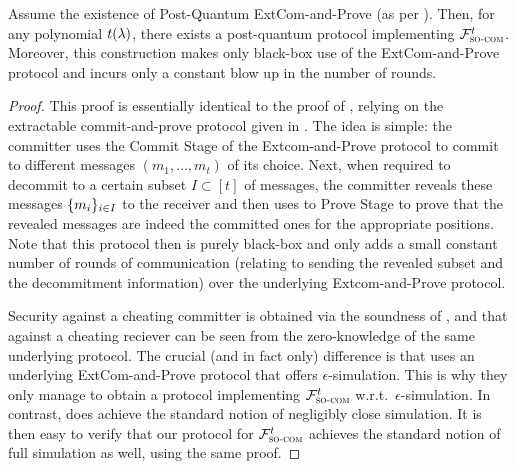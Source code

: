 \begin{lemma}
\label{lem:ExtCin-and-Prove:to:SO-Com}
Assume the existence of Post-Quantum ExtCom-and-Prove (as per ). Then, for any polynomial $t(\lambda)$, there exists a post-quantum protocol implementing $\mathcal{F}^t_\textsc{so-com}$. Moreover, this construction makes only black-box use of the ExtCom-and-Prove protocol and incurs only a constant blow up in the number of rounds.
\end{lemma}
\begin{proof}
This proof is essentially identical to the proof of \cite[Lemma 26]{C:CCLY22}, relying on the extractable commit-and-prove protocol given in . The idea is simple: the committer uses the Commit Stage of the Extcom-and-Prove protocol to commit to different messages $(m_1,\dots,m_t)$ of its choice. Next, when required to decommit to a certain subset $I \subset [t]$ of messages, the committer reveals these messages $\{m_i\}_{i \in I}$ to the receiver and then uses to Prove Stage to prove that the revealed messages are indeed the committed ones for the appropriate positions. Note that this protocol then is purely black-box and only adds a small constant number of rounds of communication (relating to sending the revealed subset and the decommitment information) over the underlying Extcom-and-Prove protocol.   

Security against a cheating committer is obtained via the soundness of , and that against a cheating reciever can be seen from the zero-knowledge of the same underlying protocol. 
The crucial (and in fact only) difference is that \cite[Lemma 26]{C:CCLY22} uses an underlying ExtCom-and-Prove protocol that offers $\epsilon$-simulation. This is why they only manage to obtain a protocol implementing $\mathcal{F}^t_\textsc{so-com}$ w.r.t.\ $\epsilon$-simulation. In contrast,  does achieve the standard notion of negligibly close simulation. It is then easy to verify that our protocol for $\mathcal{F}^t_\textsc{so-com}$ achieves the standard notion of full simulation as well, using the same proof.
\end{proof}





